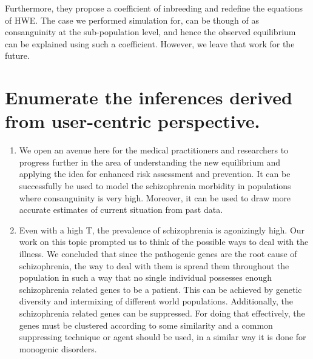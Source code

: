 \documentclass{article}
\begin{document}
\begin{itemize}
    Furthermore, they propose a coefficient of inbreeding and redefine the equations of HWE. The case we performed simulation for, can be though of as consanguinity at the sub-population level, and hence the observed equilibrium can be explained using such a coefficient. However, we leave that work for the future.
\end{itemize}


\section{Enumerate the inferences derived from user-centric perspective.}
	
\begin{enumerate}
\item We open an avenue here for the medical practitioners and researchers to progress further in the area of understanding the new equilibrium and applying the idea for enhanced risk assessment and prevention. It can be successfully be used to model the schizophrenia morbidity in populations where consanguinity is very high. Moreover, it can be used to draw more accurate estimates of current situation from past data.
\item Even with a high T, the prevalence of schizophrenia is agonizingly high. Our work on this topic prompted us to think of the possible ways to deal with the illness. We concluded that since the pathogenic genes are the root cause of schizophrenia, the way to deal with them is spread them throughout the population in such a way that no single individual possesses enough schizophrenia related genes to be a patient. This can be achieved by genetic diversity and intermixing of different world populations. Additionally, the schizophrenia related genes can be suppressed. For doing that effectively, the genes must be clustered according to some similarity and a common suppressing technique or agent should be used, in a similar way it is done for monogenic disorders.
\end{enumerate} 
\newpage
\end{document}
